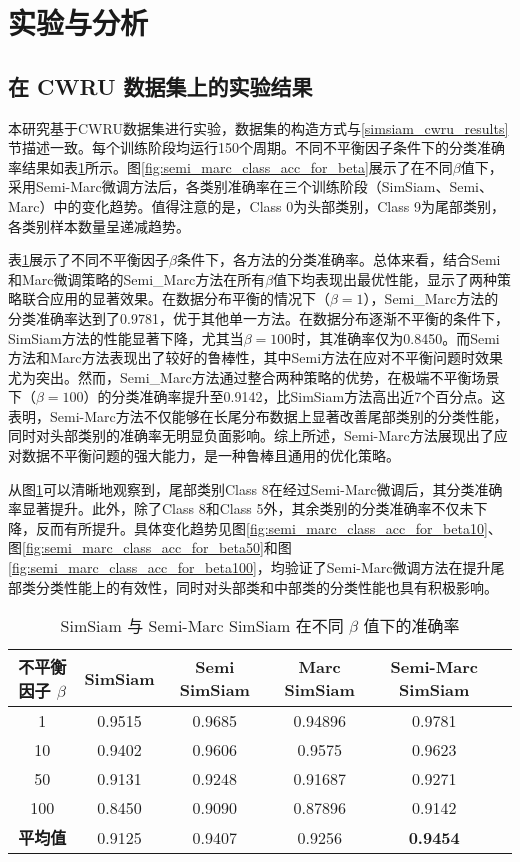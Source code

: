\documentclass[master]{thesis-uestc}
\begin{document}
\section{实验与分析}

\subsection{在 CWRU 数据集上的实验结果}
本研究基于CWRU数据集进行实验，数据集的构造方式与\ref{simsiam_cwru_results}节描述一致。每个训练阶段均运行150个周期。不同不平衡因子条件下的分类准确率结果如表\ref{simsiam_semi_results}所示。图\ref{fig:semi_marc_class_acc_for_beta}展示了在不同$\beta$值下，采用Semi-Marc微调方法后，各类别准确率在三个训练阶段（SimSiam、Semi、Marc）中的变化趋势。值得注意的是，Class 0为头部类别，Class 9为尾部类别，各类别样本数量呈递减趋势。

表\ref{simsiam_semi_results}展示了不同不平衡因子$\beta$条件下，各方法的分类准确率。总体来看，结合Semi和Marc微调策略的Semi\_Marc方法在所有$\beta$值下均表现出最优性能，显示了两种策略联合应用的显著效果。在数据分布平衡的情况下（$\beta=1$），Semi\_Marc方法的分类准确率达到了0.9781，优于其他单一方法。在数据分布逐渐不平衡的条件下，SimSiam方法的性能显著下降，尤其当$\beta=100$时，其准确率仅为0.8450。而Semi方法和Marc方法表现出了较好的鲁棒性，其中Semi方法在应对不平衡问题时效果尤为突出。然而，Semi\_Marc方法通过整合两种策略的优势，在极端不平衡场景下（$\beta=100$）的分类准确率提升至0.9142，比SimSiam方法高出近7个百分点。这表明，Semi-Marc方法不仅能够在长尾分布数据上显著改善尾部类别的分类性能，同时对头部类别的准确率无明显负面影响。综上所述，Semi-Marc方法展现出了应对数据不平衡问题的强大能力，是一种鲁棒且通用的优化策略。

从图\ref{simsiam_semi_results}可以清晰地观察到，尾部类别Class 8在经过Semi-Marc微调后，其分类准确率显著提升。此外，除了Class 8和Class 5外，其余类别的分类准确率不仅未下降，反而有所提升。具体变化趋势见图\ref{fig:semi_marc_class_acc_for_beta10}、图\ref{fig:semi_marc_class_acc_for_beta50}和图\ref{fig:semi_marc_class_acc_for_beta100}，均验证了Semi-Marc微调方法在提升尾部类分类性能上的有效性，同时对头部类和中部类的分类性能也具有积极影响。

\begin{table}[h]
    \caption{SimSiam 与 Semi-Marc SimSiam 在不同 $\beta$ 值下的准确率}
    \centering
    \begin{tabular}{cccccc}
    \toprule
    不平衡因子 $\beta$  & SimSiam & Semi SimSiam & Marc SimSiam & Semi-Marc SimSiam \\
    \midrule
    1   & 0.9515 & 0.9685 & 0.94896 & 0.9781 \\
    10  & 0.9402 & 0.9606 & 0.9575  & 0.9623 \\
    50  & 0.9131 & 0.9248 & 0.91687 & 0.9271 \\
    100 & 0.8450 & 0.9090 & 0.87896 & 0.9142 \\
    \midrule
    \textbf{平均值} & 0.9125 & 0.9407 & 0.9256 & \textbf{0.9454} \\
    \bottomrule
    \end{tabular}
    \label{simsiam_semi_results}
\end{table}
\end{document}
